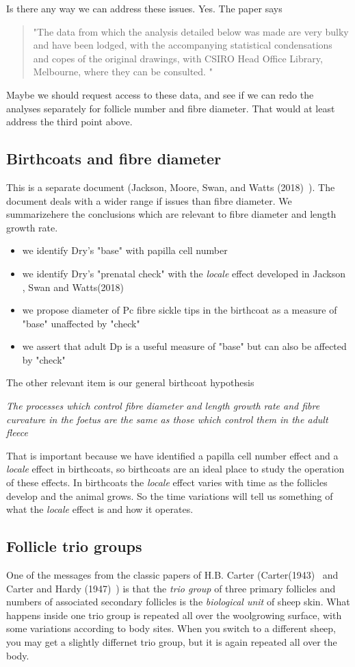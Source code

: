 \documentclass[titlepage]{article}  %
\begin{document}
Is there any way we can address these issues. Yes. The paper says
\begin{quote}
"The data from which the analysis detailed below was made are very bulky and have been lodged, with the accompanying statistical condensations and copes of the original drawings, with CSIRO Head Office Library, Melbourne, where they can be consulted. "
\end{quote}
Maybe we should request access to these data, and see if we can redo the analyses separately for follicle number and fibre diameter. That would at least address the third point above.

\subsection{Birthcoats and fibre diameter}
This is a separate document (Jackson, Moore, Swan, and Watts (2018)~\cite{jack:18b}). The document deals with a wider range if issues than fibre diameter. We summarizehere the conclusions which are relevant to fibre diameter and length growth rate.
\begin{itemize}
\item we identify Dry's "base" with papilla cell number
\item we identify Dry's "prenatal check" with the {\em locale} effect developed in Jackson , Swan and Watts(2018)~\cite{jackswan:18}
\item we propose diameter of Pc fibre sickle tips in the birthcoat as a measure of "base" unaffected by "check"
\item we assert that adult Dp is a useful measure of "base" but can also be affected by "check"
\end{itemize}

The other relevant item is our general birthcoat hypothesis

{\em The processes which control fibre diameter and length growth rate and fibre curvature in the foetus are the same as those which control them in the adult fleece}

That is important because  we have identified a papilla cell number effect and a {\em locale} effect in birthcoats, so birthcoats are an ideal place to study the operation of these effects. In birthcoats the {\em locale} effect varies with time as the follicles develop and the animal grows. So the time variations will tell us something of what the {\em locale} effect is and how it operates. 




\subsection{Follicle trio groups}
One of the messages from the classic papers of H.B. Carter (Carter(1943)~\cite{cart:43} and Carter and Hardy (1947)~\cite{cart:47}) is that the {\em trio group} of three primary follicles and numbers of associated secondary follicles is the {\em biological unit} of sheep skin. What happens inside one trio group is repeated all over the woolgrowing surface, with some variations according to body sites. When you switch to  a different sheep, you may get a slightly differnet trio group, but it is again repeated all over the body.
\end{document}
